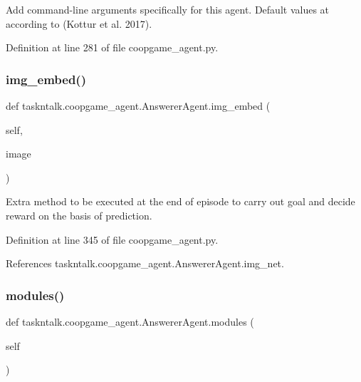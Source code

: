 \begin{DoxyVerb}Add command-line arguments specifically for this agent. Default
values at according to (Kottur et al. 2017).\end{DoxyVerb}
 

Definition at line 281 of file coopgame\+\_\+agent.\+py.

\mbox{\label{classtaskntalk_1_1coopgame__agent_1_1AnswererAgent_aeb7931b0d9776e491b4ea5cc5979680e}} 
\subsubsection{\texorpdfstring{img\+\_\+embed()}{img\_embed()}}
{\footnotesize\ttfamily def taskntalk.\+coopgame\+\_\+agent.\+Answerer\+Agent.\+img\+\_\+embed (\begin{DoxyParamCaption}\item[{}]{self,  }\item[{}]{image }\end{DoxyParamCaption})}

\begin{DoxyVerb}Extra method to be executed at the end of episode to carry out goal
and decide reward on the basis of prediction.
\end{DoxyVerb}
 

Definition at line 345 of file coopgame\+\_\+agent.\+py.



References taskntalk.\+coopgame\+\_\+agent.\+Answerer\+Agent.\+img\+\_\+net.

\mbox{\label{classtaskntalk_1_1coopgame__agent_1_1AnswererAgent_a644b0248b9379ad817a07cd61b4f9bc3}} 
\subsubsection{\texorpdfstring{modules()}{modules()}}
{\footnotesize\ttfamily def taskntalk.\+coopgame\+\_\+agent.\+Answerer\+Agent.\+modules (\begin{DoxyParamCaption}\item[{}]{self }\end{DoxyParamCaption})}



